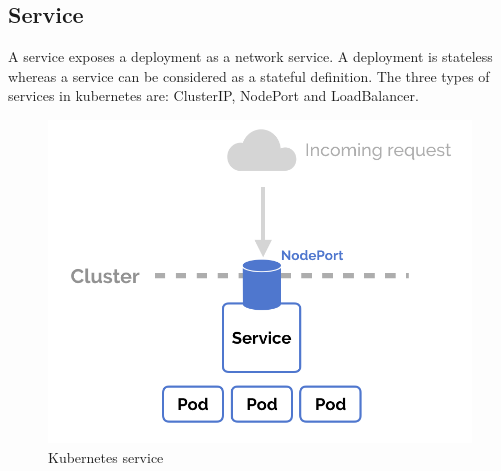 \documentclass[12pt]{report}
\begin{document}
\subsection{Service}
A service exposes a deployment as a network service. A deployment is stateless whereas a service can be considered as a stateful definition. The three types of services in kubernetes are: ClusterIP, NodePort and LoadBalancer.\\
\begin{figure}[h!]
	\begin{center}
		\includegraphics[totalheight=0.25\textheight]{service}
		\caption{Kubernetes service \cite{Service}}
	\end{center}
\end{figure}
\end{document}
